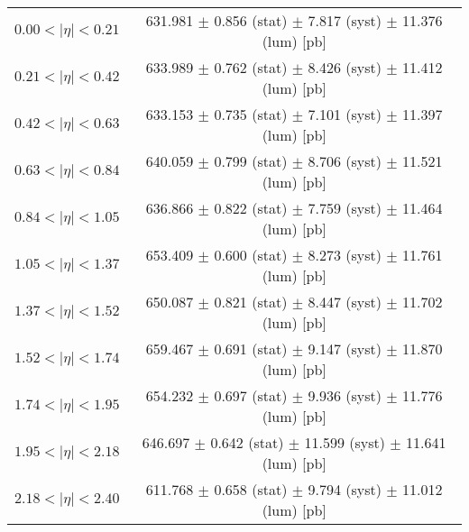 \begin{tabular}{lc}
\hline
$0.00 < |\eta| <0.21$          & 631.981 $\pm$ 0.856 (stat) $\pm$ 7.817 (syst) $\pm$ 11.376 (lum) [pb]  \\
$0.21 < |\eta| <0.42$          & 633.989 $\pm$ 0.762 (stat) $\pm$ 8.426 (syst) $\pm$ 11.412 (lum) [pb]  \\
$0.42 < |\eta| <0.63$          & 633.153 $\pm$ 0.735 (stat) $\pm$ 7.101 (syst) $\pm$ 11.397 (lum) [pb]  \\
$0.63 < |\eta| <0.84$          & 640.059 $\pm$ 0.799 (stat) $\pm$ 8.706 (syst) $\pm$ 11.521 (lum) [pb]  \\
$0.84 < |\eta| <1.05$          & 636.866 $\pm$ 0.822 (stat) $\pm$ 7.759 (syst) $\pm$ 11.464 (lum) [pb]  \\
$1.05 < |\eta| <1.37$          & 653.409 $\pm$ 0.600 (stat) $\pm$ 8.273 (syst) $\pm$ 11.761 (lum) [pb]  \\
$1.37 < |\eta| <1.52$          & 650.087 $\pm$ 0.821 (stat) $\pm$ 8.447 (syst) $\pm$ 11.702 (lum) [pb]  \\
$1.52 < |\eta| <1.74$          & 659.467 $\pm$ 0.691 (stat) $\pm$ 9.147 (syst) $\pm$ 11.870 (lum) [pb]  \\
$1.74 < |\eta| <1.95$          & 654.232 $\pm$ 0.697 (stat) $\pm$ 9.936 (syst) $\pm$ 11.776 (lum) [pb]  \\
$1.95 < |\eta| <2.18$          & 646.697 $\pm$ 0.642 (stat) $\pm$ 11.599 (syst) $\pm$ 11.641 (lum) [pb]  \\
$2.18 < |\eta| <2.40$          & 611.768 $\pm$ 0.658 (stat) $\pm$ 9.794 (syst) $\pm$ 11.012 (lum) [pb]  \\
\hline
\end{tabular}
